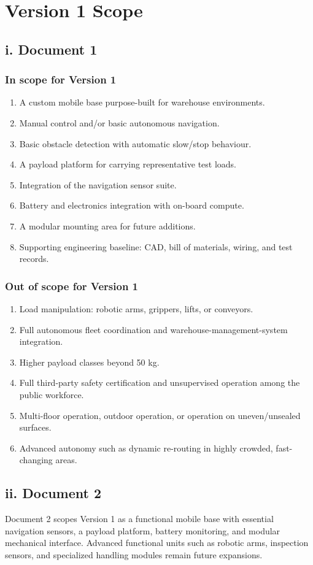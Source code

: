\chapter{Version 1 Scope}

\section*{i. Document 1}

\subsection*{In scope for Version 1}

\begin{enumerate}
    \item A custom mobile base purpose-built for warehouse environments.
    \item Manual control and/or basic autonomous navigation.
    \item Basic obstacle detection with automatic slow/stop behaviour.
    \item A payload platform for carrying representative test loads.
    \item Integration of the navigation sensor suite.
    \item Battery and electronics integration with on-board compute.
    \item A modular mounting area for future additions.
    \item Supporting engineering baseline: CAD, bill of materials, wiring, and test records.
\end{enumerate}

\subsection*{Out of scope for Version 1}

\begin{enumerate}
    \item Load manipulation: robotic arms, grippers, lifts, or conveyors.
    \item Full autonomous fleet coordination and warehouse-management-system integration.
    \item Higher payload classes beyond 50 kg.
    \item Full third-party safety certification and unsupervised operation among the public workforce.
    \item Multi-floor operation, outdoor operation, or operation on uneven/unsealed surfaces.
    \item Advanced autonomy such as dynamic re-routing in highly crowded, fast-changing areas.
\end{enumerate}

\section*{ii. Document 2}

Document 2 scopes Version 1 as a functional mobile base with essential navigation sensors, a payload platform, battery monitoring, and modular mechanical interface. Advanced functional units such as robotic arms, inspection sensors, and specialized handling modules remain future expansions.
